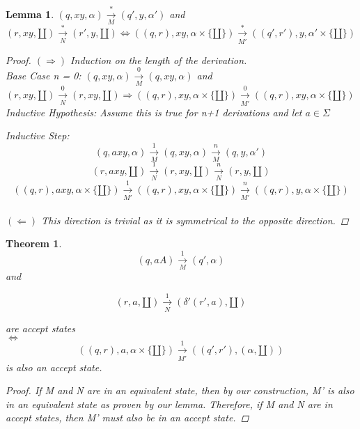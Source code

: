 \documentclass[11pt]{article}
\newtheorem{lemma}{Lemma}
\newtheorem{theorem}{Theorem}
\begin{document}
\begin{lemma}
$(q, xy, \alpha) \xrightarrow[M]{*} (q', y, \alpha ')$ and $(r, xy, \amalg) \xrightarrow[N]{*} (r', y, \amalg) \iff ((q, r), xy, \alpha \times \{\amalg\}) \xrightarrow[M']{*} ((q', r'), y, \alpha '\times \{\amalg\})$

\begin{proof}
$(\Rightarrow)$ Induction on the length of the derivation.\\
Base Case n = 0: $(q, xy, \alpha) \xrightarrow[M]{0} (q, xy, \alpha)$ and $(r, xy, \amalg) \xrightarrow[N]{0} (r, xy, \amalg) \Rightarrow ((q, r), xy, \alpha \times \{\amalg\}) \xrightarrow[M']{0} ((q, r), xy, \alpha \times \{\amalg\})$\\

\noindent Inductive Hypothesis: Assume this is true for n+1 derivations and let $a \in \Sigma$

\noindent Inductive Step:\\
$$(q, axy, \alpha) \xrightarrow[M]{1} (q, xy, \alpha) \xrightarrow[M]{n} (q, y, \alpha ')$$
$$(r, axy, \amalg) \xrightarrow[N]{1} (r, xy, \amalg) \xrightarrow[N]{n} (r, y, \amalg)$$
$$((q, r), axy, \alpha \times \{\amalg\}) \xrightarrow[M']{1} ((q, r), xy, \alpha \times \{\amalg\}) \xrightarrow[M']{n} ((q, r), y, \alpha \times \{\amalg\})$$\\

$(\Leftarrow)$ This direction is trivial as it is symmetrical to the opposite direction.
\end{proof}
\end{lemma}

\begin{theorem}

$$(q, a A) \xrightarrow[M]{1} (q', \alpha)$$ 
\center and 

$$(r, a, \amalg) \xrightarrow[N]{1} (\delta ' (r', a), \amalg)$$ 

\center are accept states \\
\center$\iff$
$$((q, r), a, \alpha \times \{\amalg\}) \xrightarrow[M']{1} ((q', r'), (\alpha, \amalg))$$ is also an accept state.

\begin{proof}
If M and N are in an equivalent state, then by our construction, M' is also in an equivalent state as proven by our lemma. Therefore, if M and N are in accept states, then M' must also be in an accept state.
\end{proof}
\end{theorem}
\end{document}
